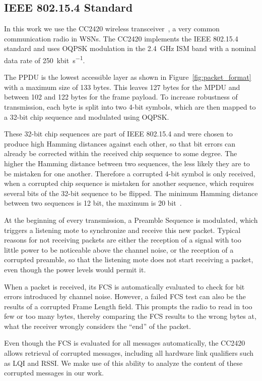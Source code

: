 \subsection{IEEE 802.15.4 Standard}

In this work we use the CC2420 wireless transceiver~\cite{cc2420}, a very common communication radio in \acp{WSN}.
The CC2420 implements the \ac{IEEE} 802.15.4 standard and uses \ac{OQPSK} modulation in the \SI{2.4}{\giga\hertz} ISM band with a nominal data rate of \SI{250}{\kilo bit\per\second}.

The \ac{PPDU} is the lowest accessible layer as shown in Figure~\ref{fig:packet_format} with a maximum size of 133 bytes.
This leaves 127 bytes for the \ac{MPDU} and between 102 and 122 bytes for the frame payload.
To increase robustness of transmission, each byte is split into two 4-bit symbols, which are then mapped to a 32-bit chip sequence and modulated using \ac{OQPSK}.

These 32-bit chip sequences are part of \ac{IEEE} 802.15.4 and were chosen to produce high Hamming distances against each other, so that bit errors can already be corrected within the received chip sequence to some degree. 
The higher the Hamming distance between two sequences, the less likely they are to be mistaken for one another.
Therefore a corrupted 4-bit symbol is only received, when a corrupted chip sequence is mistaken for another sequence, which requires several bits of the 32-bit sequence to be flipped.
The minimum Hamming distance between two sequences is 12 bit, the maximum is 20 bit~\cite{Schmidt2013}.

At the beginning of every transmission, a Preamble Sequence is modulated, which triggers a listening mote to synchronize and receive this new packet.
Typical reasons for not receiving packets are either the reception of a signal with too little power to be noticeable above the channel noise, or the reception of a corrupted preamble, so that the listening mote does not start receiving a packet, even though the power levels would permit it.

When a packet is received, its \ac{FCS} is automatically evaluated to check for bit errors introduced by channel noise.
However, a failed \ac{FCS} test can also be the results of a corrupted Frame Length field.
This prompts the radio to read in too few or too many bytes, thereby comparing the \ac{FCS} results to the wrong bytes at, what the receiver wrongly considers the ``end'' of the packet.

Even though the \ac{FCS} is evaluated for all messages automatically, the CC2420 allows retrieval of corrupted messages, including all hardware link qualifiers such as \ac{LQI} and \ac{RSSI}.
We make use of this ability to analyze the content of these corrupted messages in our work.


